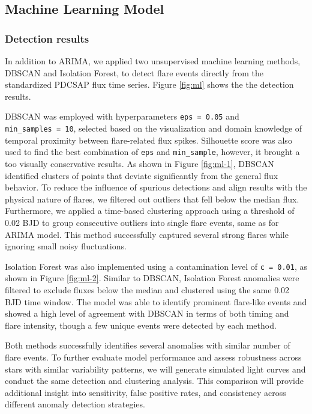 \documentclass[
]{article}
\begin{document}
\subsection{Machine Learning Model}\label{machine-learning-model}

\subsubsection{Detection results}\label{detection-results}

In addition to ARIMA, we applied two unsupervised machine learning methods, DBSCAN and Isolation Forest, to detect flare events directly from the standardized PDCSAP flux time series. Figure \ref{fig:ml} shows the the detection results.

DBSCAN was employed with hyperparameters \texttt{eps\ =\ 0.05} and \texttt{min\_samples\ =\ 10}, selected based on the visualization and domain knowledge of temporal proximity between flare-related flux spikes. Silhouette score was also used to find the best combination of \texttt{eps} and \texttt{min\_sample}, however, it brought a too visually conservative results. As shown in Figure \ref{fig:ml-1}, DBSCAN identified clusters of points that deviate significantly from the general flux behavior. To reduce the influence of spurious detections and align results with the physical nature of flares, we filtered out outliers that fell below the median flux. Furthermore, we applied a time-based clustering approach using a threshold of 0.02 BJD to group consecutive outliers into single flare events, same as for ARIMA model. This method successfully captured several strong flares while ignoring small noisy fluctuations.

Isolation Forest was also implemented using a contamination level of \texttt{c\ =\ 0.01}, as shown in Figure \ref{fig:ml-2}. Similar to DBSCAN, Isolation Forest anomalies were filtered to exclude fluxes below the median and clustered using the same 0.02 BJD time window. The model was able to identify prominent flare-like events and showed a high level of agreement with DBSCAN in terms of both timing and flare intensity, though a few unique events were detected by each method.

Both methods successfully identifies several anomalies with similar number of flare events. To further evaluate model performance and assess robustness across stars with similar variability patterns, we will generate simulated light curves and conduct the same detection and clustering analysis. This comparison will provide additional insight into sensitivity, false positive rates, and consistency across different anomaly detection strategies.
\end{document}
